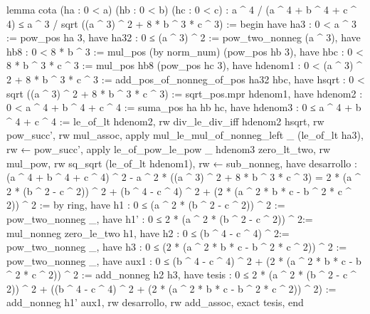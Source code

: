 \begin{leancode}
lemma cota
  (ha : 0 < a)
  (hb : 0 < b)
  (hc : 0 < c)
  : a ^ 4 / (a ^ 4 + b ^ 4 + c ^ 4) ≤
    a ^ 3 / sqrt ((a ^ 3) ^ 2 + 8 * b ^ 3 * c ^ 3) :=
begin
  have ha3 : 0 < a ^ 3 :=
    pow_pos ha 3,
  have ha32 : 0 ≤ (a ^ 3) ^ 2 :=
    pow_two_nonneg (a ^ 3),
  have hb8 : 0 < 8 * b ^ 3 :=
    mul_pos (by norm_num) (pow_pos hb 3),
  have hbc : 0 < 8 * b ^ 3 * c ^ 3 :=
    mul_pos hb8 (pow_pos hc 3),
  have hdenom1 : 0 < (a ^ 3) ^ 2 + 8 * b ^ 3 * c ^ 3 :=
    add_pos_of_nonneg_of_pos ha32 hbc,
  have hsqrt : 0 < sqrt ((a ^ 3) ^ 2 + 8 * b ^ 3 * c ^ 3) :=
    sqrt_pos.mpr hdenom1,
  have hdenom2 : 0 < a ^ 4 + b ^ 4 + c ^ 4 :=
    suma_pos ha hb hc,
  have hdenom3 : 0 ≤ a ^ 4 + b ^ 4 + c ^ 4 :=
    le_of_lt hdenom2,
  rw div_le_div_iff hdenom2 hsqrt,
  rw pow_succ',
  rw mul_assoc,
  apply mul_le_mul_of_nonneg_left _ (le_of_lt ha3),
  rw ← pow_succ',
  apply le_of_pow_le_pow _ hdenom3 zero_lt_two,
  rw mul_pow,
  rw sq_sqrt (le_of_lt hdenom1),
  rw ← sub_nonneg,
  have desarrollo :
    (a ^ 4 + b ^ 4 + c ^ 4) ^ 2 -
       a ^ 2 * ((a ^ 3) ^ 2 + 8 * b ^ 3 * c ^ 3)
    = 2 * (a ^ 2 * (b ^ 2 - c ^ 2)) ^ 2 + (b ^ 4 - c ^ 4) ^ 2 +
      (2 * (a ^ 2 * b * c - b ^ 2 * c ^ 2)) ^ 2 :=
    by ring,
  have h1 : 0 ≤ (a ^ 2 * (b ^ 2 - c ^ 2)) ^ 2 :=
    pow_two_nonneg _,
  have h1' : 0 ≤ 2 * (a ^ 2 * (b ^ 2 - c ^ 2)) ^ 2:=
    mul_nonneg zero_le_two h1,
  have h2 : 0 ≤ (b ^ 4 - c ^ 4) ^ 2:=
    pow_two_nonneg _,
  have h3 : 0 ≤ (2 * (a ^ 2 * b * c - b ^ 2 * c ^ 2)) ^ 2 :=
    pow_two_nonneg _,
  have aux1 : 0 ≤ (b ^ 4 - c ^ 4) ^ 2 +
                  (2 * (a ^ 2 * b * c - b ^ 2 * c ^ 2)) ^ 2 :=
    add_nonneg h2 h3,
  have tesis : 0 ≤ 2 * (a ^ 2 * (b ^ 2 - c ^ 2)) ^ 2 +
                   ((b ^ 4 - c ^ 4) ^ 2 +
                    (2 * (a ^ 2 * b * c - b ^ 2 * c ^ 2)) ^ 2) :=
    add_nonneg h1' aux1,
  rw desarrollo,
  rw add_assoc,
  exact tesis,
end
\end{leancode}

